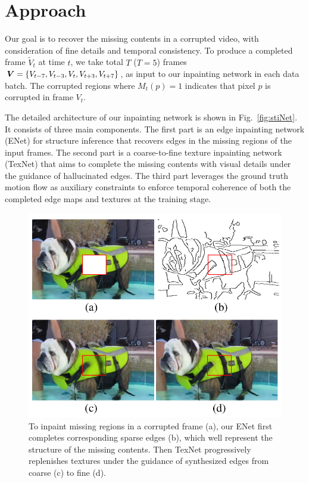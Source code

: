 

\section{Approach}\label{sec:approach}


Our goal is to recover the missing contents in a corrupted video, with consideration of fine details and temporal consistency.
To produce a completed frame $\widetilde{V}_t$ at time $t$, we take total $T$ ($T=5$) frames $\boldsymbol{V}=\{V_{t-7},V_{t-3},V_{t},V_{t+3},V_{t+7}\}$, as input to our inpainting network in each data batch. 
The corrupted regions  where $M_t(p)=1$ indicates that pixel $p$ is corrupted in frame $V_t$. 
%
 
The detailed architecture of our inpainting network is shown in 
Fig.~\ref{fig:stiNet}.
It consists of three main components. 
The first part is an edge inpainting network (ENet) for structure inference that recovers edges in the missing regions of the input frames.
The second part is a coarse-to-fine texture inpainting network (TexNet) that aims to complete the missing contents with visual details under the guidance of hallucinated edges.
The third part leverages the ground truth motion flow as auxiliary constraints to enforce temporal coherence of both the completed edge maps and textures at the training stage.


\begin{figure}[t]
	\centering
	\includegraphics[width=0.8\columnwidth]{coars-fine} 
	\caption{To inpaint missing regions in a corrupted frame (a), our ENet first completes corresponding sparse edges (b), which well represent the structure of the missing contents. Then TexNet progressively replenishes textures under the guidance of synthesized edges from coarse (c) to fine (d).}
	
	\label{fig:coarse-fine}
\end{figure}

